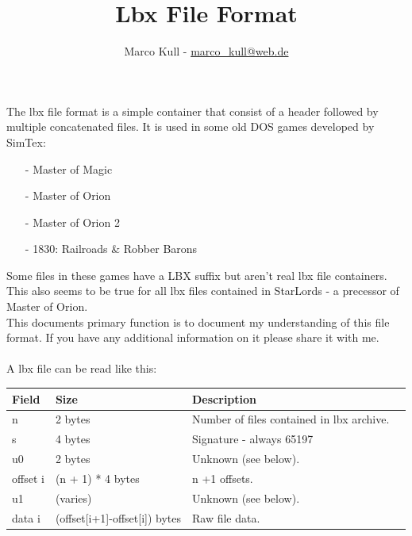 \documentclass[a4paper]{scrartcl}
\begin{document}
\title{Lbx File Format}
\author{Marco Kull - \href{mailto:marco_kull@web.de}{marco\_kull@web.de}}\date{}
\maketitle
\thispagestyle{empty}
\pagestyle{empty}
The lbx file format is a simple container that consist of a header followed by multiple concatenated files. It is used in some old DOS games developed by SimTex:
\begin{itemize}
\item[-] Master of Magic
\item[-] Master of Orion
\item[-] Master of Orion 2
\item[-] 1830: Railroads \& Robber Barons
\end{itemize}
Some files in these games have a LBX suffix but aren't real lbx file containers. This also seems to be true for all lbx files contained in StarLords - a precessor of Master of Orion.\\
This documents primary function is to document my understanding of this file format. If you have any additional information on it please share it with me.\\\\
A lbx file can be read like this:
\begin{flushleft}
\begin{tabular}{|l|l|l|l|}
\hline
\textbf{Field} & \textbf{Size} & \textbf{Description}\\ 
\hline \hline
n & 2 bytes & Number of files contained in lbx archive.\\\hline
s & 4 bytes & Signature - always 65197\\\hline
u0 & 2 bytes & Unknown (see below).\\\hline
offset i & (n + 1) * 4 bytes & n +1 offsets.\\\hline
u1 & (varies) & Unknown (see below).\\\hline
data i & (offset[i+1]-offset[i]) bytes & Raw file data.\\\hline

\end{tabular}
\end{flushleft}
\end{document}
